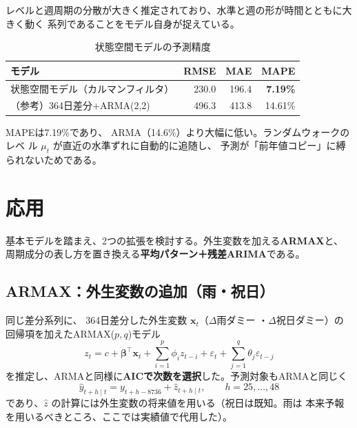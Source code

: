 \documentclass[a4paper,11pt]{ltjsarticle}
\begin{document}
レベルと週周期の分散が大きく推定されており、水準と週の形が時間とともに大きく動く
系列であることをモデル自身が捉えている。

\begin{table}[htbp]
  \centering
  \caption{状態空間モデルの予測精度}
  \begin{tabular}{lrrr}
    \toprule
    モデル & RMSE & MAE & MAPE \\
    \midrule
    状態空間モデル（カルマンフィルタ） & 230.0 & 196.4 & \textbf{7.19\%} \\
    （参考）364日差分+ARMA(2,2) & 496.3 & 413.8 & 14.61\% \\
    \bottomrule
  \end{tabular}
\end{table}

MAPEは7.19\%であり、%
ARMA（14.6\%）より大幅に低い。ランダムウォークのレベ
ル $\mu_t$ が直近の水準ずれに自動的に追随し、
予測が「前年値コピー」に縛られないためである。

\section{応用}

基本モデルを踏まえ、2つの拡張を検討する。外生変数を加える\textbf{ARMAX}と、
周期成分の表し方を置き換える\textbf{平均パターン＋残差ARIMA}である。

\subsection{ARMAX：外生変数の追加（雨・祝日）}
\label{sec:armax}

同じ差分系列に、%
364日差分した外生変数 $\bm{x}_t$（$\Delta$雨ダミー
・$\Delta$祝日ダミー）の回帰項を加えたARMAX($p,q$)モデル
\begin{equation*}
  z_t = c + \bm{\beta}^\top \bm{x}_t + \sum_{i=1}^{p} \phi_i z_{t-i} + \varepsilon_t + \sum_{j=1}^{q} \theta_j \varepsilon_{t-j}
\end{equation*}
を推定し、ARMAと同様に\textbf{AICで次数を選択}した。予測対象もARMAと同じく
\begin{equation*}
  \hat{y}_{t+h\mid t} = y_{t+h-8736} + \hat{z}_{t+h\mid t}, \qquad h = 25, \dots, 48
\end{equation*}
であり、$\hat{z}$ の計算には外生変数の将来値を用いる（祝日は既知。雨は
本来予報を用いるべきところ、ここでは実績値で代用した）。
\end{document}
